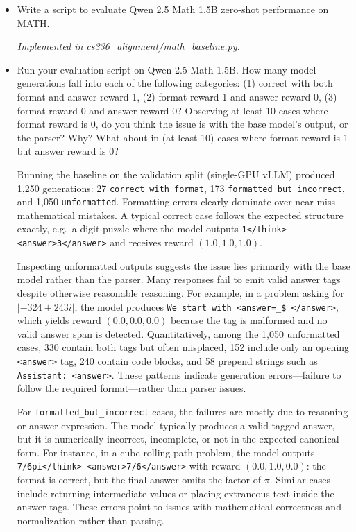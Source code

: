 \documentclass[letterpaper]{article}
\newcommand{\repofile}[2]{\href{https://github.com/echung32/ece405-assignment3-alignment/blob/main/#1}{#2}}
\begin{document}
	\begin{itemize}
		\item[(a)] Write a script to evaluate Qwen 2.5 Math 1.5B zero-shot performance on MATH.
		
		\textit{Implemented in \repofile{cs336_alignment/math_baseline.py}{cs336\_alignment/math\_baseline.py}.}
		
		\item[(b)] Run your evaluation script on Qwen 2.5 Math 1.5B. How many model generations fall into each of the following categories: (1) correct with both format and answer reward 1, (2) format reward 1 and answer reward 0, (3) format reward 0 and answer reward 0? Observing at least 10 cases where format reward is 0, do you think the issue is with the base model’s output, or the parser? Why? What about in (at least 10) cases where format reward is 1 but answer reward is 0?
		
		Running the baseline on the validation split (single-GPU vLLM) produced 1{,}250 generations: 27 \texttt{correct\_with\_format}, 173 \texttt{formatted\_but\_incorrect}, and 1{,}050 \texttt{unformatted}. Formatting errors clearly dominate over near-miss mathematical mistakes. A typical correct case follows the expected structure exactly, e.g.\ a digit puzzle where the model outputs \texttt{1</think> <answer>3</answer>} and receives reward $(1.0, 1.0, 1.0)$.
		
		Inspecting unformatted outputs suggests the issue lies primarily with the base model rather than the parser. Many responses fail to emit valid answer tags despite otherwise reasonable reasoning. For example, in a problem asking for $|{-324} + 243i|$, the model produces \texttt{We start with <answer=\_\$ </answer>}, which yields reward $(0.0, 0.0, 0.0)$ because the tag is malformed and no valid answer span is detected. Quantitatively, among the 1{,}050 unformatted cases, 330 contain both tags but often misplaced, 152 include only an opening \texttt{<answer>} tag, 240 contain code blocks, and 58 prepend strings such as \texttt{Assistant: <answer>}. These patterns indicate generation errors—failure to follow the required format—rather than parser issues.
		
		For \texttt{formatted\_but\_incorrect} cases, the failures are mostly due to reasoning or answer expression. The model typically produces a valid tagged answer, but it is numerically incorrect, incomplete, or not in the expected canonical form. For instance, in a cube-rolling path problem, the model outputs \texttt{7/6pi</think> <answer>7/6</answer>} with reward $(0.0, 1.0, 0.0)$: the format is correct, but the final answer omits the factor of $\pi$. Similar cases include returning intermediate values or placing extraneous text inside the answer tags. These errors point to issues with mathematical correctness and normalization rather than parsing.
		

\end{itemize}
\end{document}
